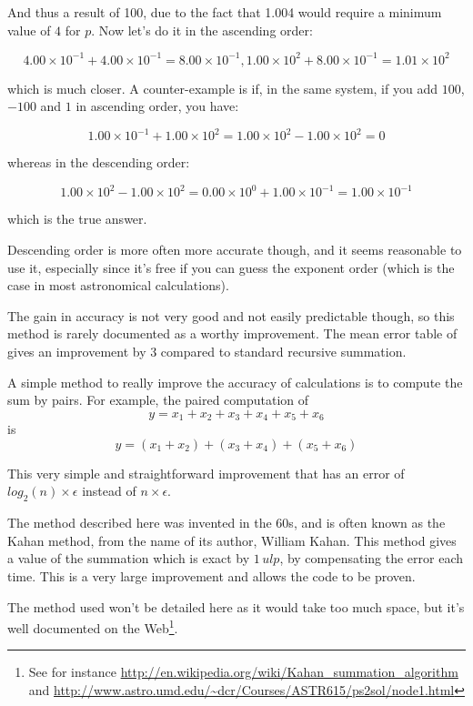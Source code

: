 And thus a result of 100, due to the fact that 1.004 would require a minimum value of $4$ for $p$. Now let's do it in the ascending order:

$$4.00\times 10^{-1} + 4.00\times 10^{-1} = 8.00\times 10^{-1}, 1.00\times 10^2 + 8.00 \times 10^{-1} = 1.01\times 10^2$$

which is much closer. A counter-example is if, in the same system, if you add $100$, $-100$ and $1$ in ascending order, you have:

$$1.00\times 10^{-1} + 1.00\times 10^{2} = 1.00\times 10^{2} - 1.00\times 10^{2} = 0$$

whereas in the descending order:

$$1.00\times 10^{2} - 1.00\times 10^{2} = 0.00\times 10^{0} + 1.00\times 10^{-1} = 1.00\times 10^{-1}$$

which is the true answer.

Descending order is more often more accurate though, and it seems reasonable to use it, especially since it's free if you can guess the exponent order (which is the case in most astronomical calculations).

The gain in accuracy is not very good and not easily predictable though, so this method is rarely documented as a worthy improvement. The mean error table of \cite{Higham} gives an improvement by 3 compared to standard recursive summation.


A simple method to really improve the accuracy of calculations is to compute the sum by pairs. For example, the paired computation of $$y=x_1+x_2+x_3+x_4+x_5+x_6$$ is $$y=(x_1+x_2)+(x_3+x_4)+(x_5+x_6)$$

This very simple and straightforward improvement that has an error of $log_2(n)\times\epsilon$ instead of $n\times\epsilon$.

\label{compensated}

The method described here was invented in the 60s, and is often known as the Kahan method, from the name of its author, William Kahan. This method gives a value of the summation which is exact by $1\,ulp$, by compensating the error each time. This is a very large improvement and allows the code to be proven.

The method used won't be detailed here as it would take too much space, but it's well documented on the Web\footnote{See for instance \url{http://en.wikipedia.org/wiki/Kahan_summation_algorithm} and \url{http://www.astro.umd.edu/~dcr/Courses/ASTR615/ps2sol/node1.html}}.

